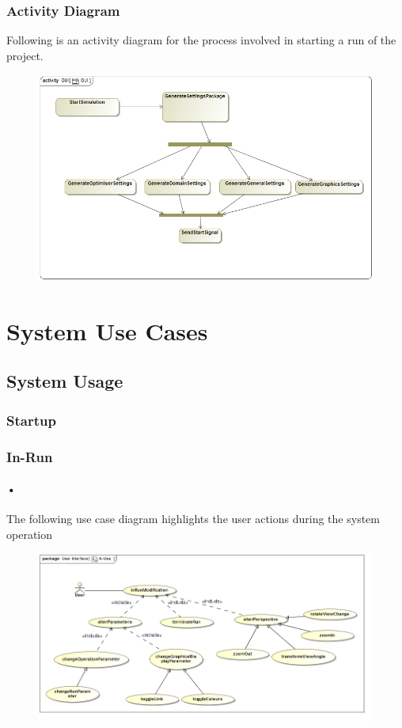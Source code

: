 \documentclass[11pt]{article}
\begin{document}
\subsubsection{Activity Diagram}
Following is an activity diagram for the process involved in starting a run of the project.
\begin{figure}[H]
	\includegraphics[scale=0.45]{GUI_Activity.jpg}
\end{figure}

\section{System Use Cases}
\subsection{System Usage}
\subsubsection{Startup}
\subsubsection{In-Run}
\paragraph{•}
The following use case diagram highlights the user actions during the system operation
\begin{figure}[H]
	\includegraphics[scale=0.55]{inUse.png}
\end{figure}
\end{document}
